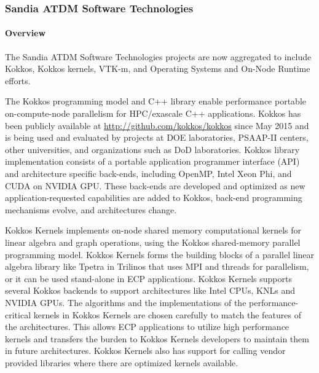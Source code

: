 \subsubsection{ Sandia ATDM Software Technologies}

\paragraph{Overview} %

The Sandia ATDM Software Technologies projects are now aggregated to include Kokkos, Kokkos kernels, VTK-m, and Operating Systems and On-Node Runtime efforts. 

The Kokkos programming model and C++ library enable performance portable on-compute-node parallelism for HPC/exascale C++ applications. Kokkos has been publicly available at \url{http://github.com/kokkos/kokkos} since May 2015 and is being used and evaluated by projects at DOE laboratories, PSAAP-II centers, other universities, and organizations such as DoD laboratories. Kokkos library implementation consists of a portable application programmer interface (API) and architecture specific back-ends, including OpenMP, Intel Xeon Phi, and CUDA on NVIDIA GPU. These back-ends are developed and optimized as new application-requested capabilities are added to Kokkos, back-end programming mechanisms evolve, and architectures change.

Kokkos Kernels implements on-node shared memory computational kernels for linear algebra and graph operations, using the Kokkos shared-memory parallel programming model. Kokkos Kernels forms the building blocks of a parallel linear algebra library like Tpetra in Trilinos that uses MPI and threads for parallelism, or it can be used stand-alone in ECP applications. Kokkos Kernels supports several Kokkos backends to support architectures like Intel CPUs, KNLs and NVIDIA GPUs. The algorithms and the implementations of the performance-critical kernels in Kokkos Kernels are chosen carefully to match the features of the architectures. This allows ECP applications to utilize high performance kernels and transfers the burden to Kokkos Kernels developers to maintain them in future architectures. Kokkos Kernels also has support for calling vendor provided libraries where there are optimized kernels available.

